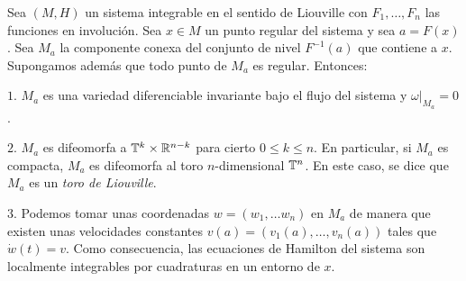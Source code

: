 \begin{thm}\label{arnold}
Sea $(M,H)$ un sistema integrable en el sentido de Liouville con $F_1,\dots,F_n$ las funciones en involución. Sea $x\in M$ un punto regular del sistema y sea $a=F(x)$. Sea $M_a$ la componente conexa del conjunto de nivel $F^{-1}(a)$ que contiene a $x$. Supongamos además que todo punto de $M_a$ es regular. Entonces:

$1$. $M_a$ es una variedad diferenciable invariante bajo el flujo del sistema y $\left. \omega \right|_{M_a}=0$.
  
$2$. $M_a$ es difeomorfa a $\mathbb{T}^k\times \mathbb{R}^{n-k}$ para cierto $0 \leq k \leq n$. En particular, si $M_a$ es compacta, $M_a$ es difeomorfa al toro $n$-dimensional $\mathbb{T}^n$. En este caso, se dice que $M_a$ es un \emph{toro de Liouville}. 
 
$3$. Podemos tomar unas coordenadas $w=(w_1,\dots w_n)$ en $M_a$ de manera que existen unas velocidades constantes $v(a)=(v_1(a),\dots,v_n(a))$ tales que $\dot w (t)=v$. Como consecuencia, las ecuaciones de Hamilton del sistema son localmente integrables por cuadraturas en un entorno de $x$.

\end{thm}

